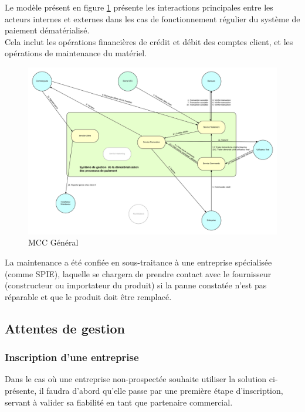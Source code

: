 Le modèle présent en figure \ref{fig:mcc-extra} présente les interactions
principales entre les acteurs internes et externes dans les cas de
fonctionnement régulier du système de paiement dématérialisé. \\

Cela inclut les opérations financières de crédit et débit des comptes client,
et les opérations de maintenance du matériel.

\begin{landscape}
  \begin{figure}[ht]
      \centering
      \includegraphics[width=0.7\paperheight]{mcc-extra}
      \caption{MCC Général}
      \label{fig:mcc-extra}
  \end{figure}
\end{landscape}

La maintenance a été confiée en sous-traitance à une entreprise spécialisée
(comme SPIE), laquelle se chargera de prendre contact avec le fournisseur
(constructeur ou importateur du produit) si la panne constatée n'est pas
réparable et que le produit doit être remplacé.

\subsection{Attentes de gestion}

\subsubsection{Inscription d'une entreprise}

Dans le cas où une entreprise non-prospectée souhaite utiliser la solution
ci-présente, il faudra d'abord qu'elle passe par une première étape
d'inscription, servant à valider sa fiabilité en tant que partenaire
commercial.

